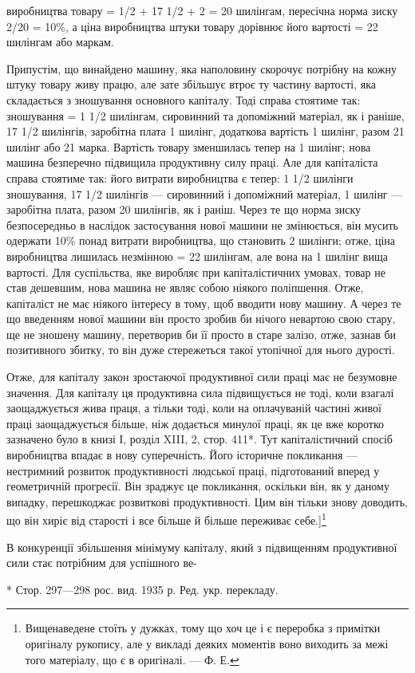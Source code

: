 виробництва товару = 1/2 + 17 1/2 + 2 = 20 шилінгам, пересічна
норма зиску 2/20 = 10\%, а ціна виробництва штуки товару дорівнює
його вартості = 22 шилінгам або маркам.

Припустім, що винайдено машину, яка наполовину скорочує
потрібну на кожну штуку товару живу працю, але зате
збільшує втроє ту частину вартості, яка складається з зношування
основного капіталу. Тоді справа стоятиме так: зношування
= 1 1/2 шилінгам, сировинний та допоміжний матеріал, як
і раніше, 17 1/2 шилінгів, заробітна плата 1 шилінг, додаткова
вартість 1 шилінг, разом 21 шилінг або 21 марка. Вартість товару
зменшилась тепер на 1 шилінг; нова машина безперечно підвищила
продуктивну силу праці. Але для капіталіста справа стоятиме
так: його витрати виробництва є тепер: 1 1/2 шилінги зношування,
17 1/2 шилінгів — сировинний і допоміжний матеріал,
1 шилінг — заробітна плата, разом 20 шилінгів, як і раніш.
Через те що норма зиску безпосередньо в наслідок застосування
нової машини не змінюється, він мусить одержати 10\%
понад витрати виробництва, що становить 2 шилінги; отже, ціна
виробництва лишилась незмінною = 22 шилінгам, але вона на 1 шилінг
вища вартості. Для суспільства, яке виробляє при капіталістичних
умовах, товар не став дешевшим, нова машина не являє
собою ніякого поліпшення. Отже, капіталіст не має ніякого
інтересу в тому, щоб вводити нову машину. А через те що
введенням нової машини він просто зробив би нічого невартою
свою стару, ще не зношену машину, перетворив би її просто
в старе залізо, отже, зазнав би позитивного збитку, то він дуже
стережеться такої утопічної для нього дурості.

Отже, для капіталу закон зростаючої продуктивної сили праці
має не безумовне значення. Для капіталу ця продуктивна сила
підвищується не тоді, коли взагалі заощаджується жива праця,
а тільки тоді, коли на оплачуваній частині живої праці заощаджується
більше, ніж додається минулої праці, як це вже коротко
зазначено було в книзі І, розділ XIII, 2, стор. 411*. Тут
капіталістичний спосіб виробництва впадає в нову суперечність.
Його історичне покликання — нестримний розвиток продуктивності
людської праці, підготований вперед у геометричній прогресії.
Він зраджує це покликання, оскільки він, як у даному
випадку, перешкоджає розвиткові продуктивності. Цим він тільки
знову доводить, що він хиріє від старості і все більше й більше
переживає себе.]\footnote{
Вищенаведене стоїть у дужках, тому що хоч це і є переробка з примітки
оригіналу рукопису, але у викладі деяких моментів воно виходить за
межі того матеріалу, що є в оригіналі. — Ф. Е.
}

В конкуренції збільшення мінімуму капіталу, який з підвищенням
продуктивної сили стає потрібним для успішного ве-

* Стор. 297—298 рос. вид. 1935 р. Ред. укр. перекладу.